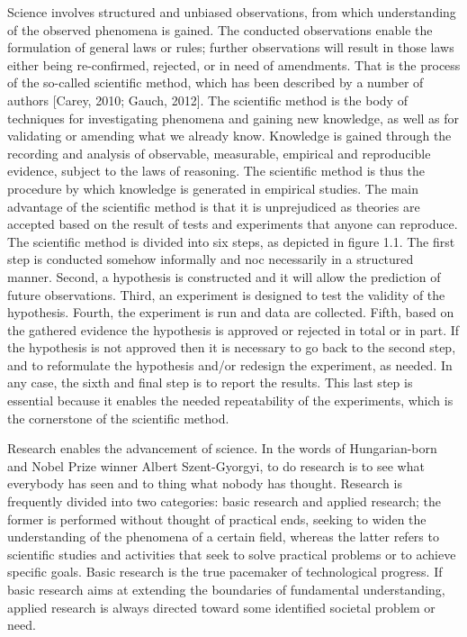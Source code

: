Science involves structured and unbiased observations, from which understanding of the observed phenomena is gained. The conducted observations enable the formulation of general laws or rules; further observations will result in those laws either being re-confirmed, rejected, or in need of amendments. That is the process of the so-called scientific method, which has been described by a number of authors [Carey, 2010; Gauch, 2012]. The scientific method is the body of techniques for investigating phenomena and gaining new knowledge, as well as for validating or amending what we already know. Knowledge is gained through the recording and analysis of observable, measurable, empirical and reproducible evidence, subject to the laws of reasoning. The scientific method is thus the procedure by which knowledge is generated in empirical studies. The main advantage of the scientific method is that it is unprejudiced as theories are accepted based on the result of tests and experiments that anyone can reproduce. The scientific method is divided into six steps, as depicted in figure 1.1. The first step is conducted somehow informally and noc necessarily in a structured manner. Second, a hypothesis is constructed and it will allow the prediction of future observations. Third, an experiment is designed to test the validity of the hypothesis. Fourth, the experiment is run and data are collected. Fifth, based on the gathered evidence the hypothesis is approved or rejected in total or in part. If the hypothesis is not approved then it is necessary to go back to the second step, and to reformulate the hypothesis and/or redesign the experiment, as needed. In any case, the sixth and final step is to report the results. This last step is essential because it enables the needed repeatability of the experiments, which is the cornerstone of the scientific method.

Research enables the advancement of science. In the words of Hungarian-born and Nobel Prize winner Albert Szent-Gyorgyi, to do research is to see what everybody has seen and to thing what nobody has thought. Research is frequently divided into two categories: basic research and applied research; the former is performed without thought of practical ends, seeking to widen the understanding of the phenomena of a certain field, whereas the latter refers to scientific studies and activities that seek to solve practical problems or to achieve specific goals. Basic research is the true pacemaker of technological progress. If basic research aims at extending the boundaries of fundamental understanding, applied research is always directed toward some identified societal problem or need.


